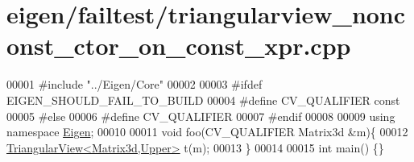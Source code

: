 \hypertarget{eigen_2failtest_2triangularview__nonconst__ctor__on__const__xpr_8cpp_source}{}\section{eigen/failtest/triangularview\+\_\+nonconst\+\_\+ctor\+\_\+on\+\_\+const\+\_\+xpr.cpp}
\label{eigen_2failtest_2triangularview__nonconst__ctor__on__const__xpr_8cpp_source}

\begin{DoxyCode}
00001 \textcolor{preprocessor}{#include "../Eigen/Core"}
00002 
00003 \textcolor{preprocessor}{#ifdef EIGEN\_SHOULD\_FAIL\_TO\_BUILD}
00004 \textcolor{preprocessor}{#define CV\_QUALIFIER const}
00005 \textcolor{preprocessor}{#else}
00006 \textcolor{preprocessor}{#define CV\_QUALIFIER}
00007 \textcolor{preprocessor}{#endif}
00008 
00009 \textcolor{keyword}{using namespace }\hyperlink{namespace_eigen}{Eigen};
00010 
00011 \textcolor{keywordtype}{void} foo(CV\_QUALIFIER Matrix3d &m)\{
00012   \hyperlink{group___core___module_class_eigen_1_1_triangular_view}{TriangularView<Matrix3d,Upper>} t(m);
00013 \}
00014 
00015 \textcolor{keywordtype}{int} main() \{\}
\end{DoxyCode}

